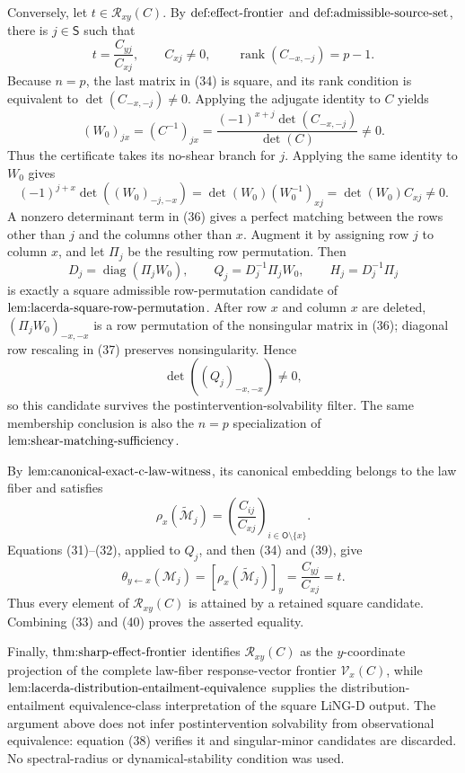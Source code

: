 Conversely, let \(t\in\mathcal R_{xy}(C)\).  By
\(\textnormal{def:effect-frontier}\) and
\(\textnormal{def:admissible-source-set}\), there is \(j\in\mathsf S\) such that
\[
 t=\frac{C_{yj}}{C_{xj}},\qquad
 C_{xj}\ne0,\qquad
 \operatorname{rank}(C_{-x,-j})=p-1.                                      \tag{34}
\]
Because \(n=p\), the last matrix in (34) is square, and its rank condition is equivalent to
\(\det(C_{-x,-j})\ne0\).  Applying the adjugate identity to \(C\) yields
\[
 (W_0)_{jx}
 =(C^{-1})_{jx}
 =\frac{(-1)^{x+j}\det(C_{-x,-j})}{\det(C)}
 \ne0.                                                                      \tag{35}
\]
Thus the certificate takes its no-shear branch for \(j\).  Applying the same identity to \(W_0\) gives
\[
 (-1)^{j+x}\det((W_0)_{-j,-x})
 =\det(W_0)(W_0^{-1})_{xj}
 =\det(W_0)C_{xj}\ne0.                                                      \tag{36}
\]
A nonzero determinant term in (36) gives a perfect matching between the rows other than \(j\) and the columns other than \(x\).  Augment it by assigning row \(j\) to column \(x\), and let \(\Pi_j\) be the resulting row permutation.  Then
\[
 D_j=\operatorname{diag}(\Pi_jW_0),\qquad
 Q_j=D_j^{-1}\Pi_jW_0,\qquad
 H_j=D_j^{-1}\Pi_j                                                        \tag{37}
\]
is exactly a square admissible row-permutation candidate of
\(\textnormal{lem:lacerda-square-row-permutation}\).  After row \(x\) and column \(x\) are deleted, \((\Pi_jW_0)_{-x,-x}\) is a row permutation of the nonsingular matrix in (36); diagonal row rescaling in (37) preserves nonsingularity.  Hence
\[
 \det((Q_j)_{-x,-x})\ne0,                                                   \tag{38}
\]
so this candidate survives the postintervention-solvability filter.  The same membership conclusion is also the \(n=p\) specialization of
\(\textnormal{lem:shear-matching-sufficiency}\).

By \(\textnormal{lem:canonical-exact-c-law-witness}\), its canonical embedding belongs to the law fiber and satisfies
\[
 \rho_x(\widetilde{\mathcal M}_j)
 =\left(\frac{C_{ij}}{C_{xj}}\right)_{i\in\mathsf O\setminus\{x\}}.          \tag{39}
\]
Equations (31)--(32), applied to \(Q_j\), and then (34) and (39), give
\[
 \theta_{y\leftarrow x}(\mathcal M_j)
 =[\rho_x(\widetilde{\mathcal M}_j)]_y
 =\frac{C_{yj}}{C_{xj}}
 =t.                                                                        \tag{40}
\]
Thus every element of \(\mathcal R_{xy}(C)\) is attained by a retained square candidate.  Combining (33) and (40) proves the asserted equality.

Finally, \(\textnormal{thm:sharp-effect-frontier}\) identifies
\(\mathcal R_{xy}(C)\) as the \(y\)-coordinate projection of the complete law-fiber response-vector frontier \(\mathcal V_x(C)\), while
\(\textnormal{lem:lacerda-distribution-entailment-equivalence}\) supplies the distribution-entailment equivalence-class interpretation of the square LiNG-D output.  The argument above does not infer postintervention solvability from observational equivalence: equation (38) verifies it and singular-minor candidates are discarded.  No spectral-radius or dynamical-stability condition was used.